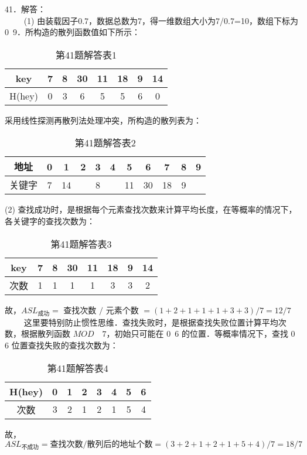 41．解答：\\
$\qquad$ (1) 由装载因子0.7，数据总数为7，得一维数组大小为7/0.7=10，数组下标为0~9．所构造的散列函数值如下所示：
\begin{table}[ht]
\centering
\caption{第41题解答表1}\label{CSN10_tab2}
\begin{tabular}{|c|c|c|c|c|c|c|c|}
\hline
key & 7 & 8 & 30 & 11 & 18 & 9 & 14 \\
\hline
H(hey) & 0 & 3 & 6 & 5 & 5 & 6 & 0 \\
\hline
\end{tabular}
\end{table}
采用线性探测再散列法处理冲突，所构造的散列表为： 
\begin{table}[ht]
\centering
\caption{第41题解答表2}\label{CSN10_tab3}
\begin{tabular}{|c|c|c|c|c|c|c|c|c|c|c|}
\hline
地址 & 0 & 1 & 2 & 3 & 4 & 5 & 6 & 7 & 8 & 9 \\
\hline
关键字 & 7 & 14 &  & 8 &  & 11 & 30 & 18 & 9 &  \\
\hline
\end{tabular}
\end{table}
(2) 查找成功时，是根据每个元素查找次数来计算平均长度，在等概率的情况下，各关键字的查找次数为：\\
\begin{table}[ht]
\centering
\caption{第41题解答表3}\label{CSN10_tab4}
\begin{tabular}{|c|c|c|c|c|c|c|c|}
\hline
key & 7 & 8 & 30 & 11 & 18 & 9 & 14 \\
\hline
次数 & 1 & 1 & 1 & 1 & 3 & 3 & 2 \\
\hline
\end{tabular}
\end{table}
故，$ASL_{\text{成功}}=$ 查找次数 $/$ 元素个数 $=(1+2+1+1+1+3+3)/7=12/7$  \\
$\qquad$ 这里要特别防止惯性思维．查找失败时，是根据查找失败位置计算平均次数，根据散列函数 $MOD  \quad 7$，初始只可能在 $0$~$6$ 的位置．等概率情况下，查找 $0$~$6$ 位置查找失败的查找次数为：\\
\begin{table}[ht]
\centering
\caption{第41题解答表4}\label{CSN10_tab5}
\begin{tabular}{|c|c|c|c|c|c|c|c|}
\hline
H(hey) & 0 & 1 & 2 & 3 & 4 & 5 & 6 \\
\hline
次数 & 3 & 2 & 1 & 2 & 1 & 5 & 4 \\
\hline
\end{tabular}
\end{table}
故，$ASL_{\text{不成功}}=\text{查找次数}/\text{散列后的地址个数}=(3+2+1+2+1+5+4)/7=18/7$


